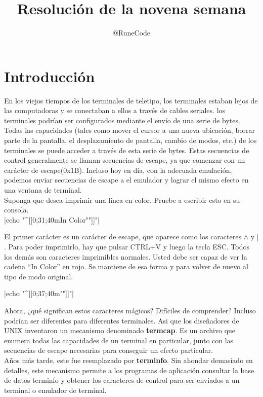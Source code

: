 \documentclass{article}
\title{Resolución de la novena semana}
\author{@RuneCode}
\begin{document}



\section{Introducción}%
En los viejos tiempos de los terminales de teletipo, los terminales estaban
lejos de las computadoras y se conectaban a ellos a través de cables seriales.
los terminales podrían ser configurados mediante el envío de una serie de
bytes. Todas las capacidades (tales como mover el cursor a una nueva ubicación,
borrar parte de la pantalla, el desplazamiento de pantalla, cambio de modos,
etc.) de los terminales se puede acceder a través de esta serie de bytes. Estas
secuencias de control generalmente se llaman secuencias de escape, ya que
comenzar con un carácter de escape(0x1B). Incluso hoy en día, con la adecuada
emulación, podemos enviar secuencias de escape a el emulador y lograr el mismo
efecto en una ventana de terminal.\\

Suponga que desea imprimir una línea en color. Pruebe a escribir esto en su
consola.\\

|echo "^[[0;31;40mIn Color""]]"|

El primer carácter es un carácter de escape, que aparece como los caracteres $\wedge$
y $[$. Para poder imprimirlo, hay que pulsar CTRL+V y luego la tecla ESC. Todos
los demás son caracteres imprimibles normales. Usted debe ser capaz de ver la
cadena “In Color” en rojo. Se mantiene de esa forma y para volver de nuevo al
tipo de modo original.

|echo "^[[0;37;40m""]]"|

Ahora, ¿qué significan estos caracteres mágicos? Difíciles de comprender?
Incluso podrían ser diferentes para diferentes terminales. Asi que los
diseñadores de UNIX inventaron un mecanismo denominado \textbf{termcap}. Es un
archivo que enumera todas las capacidades de un terminal en particular, junto
con las secuencias de escape necesarias para conseguir un efecto particular.\\
Años más tarde, este fue reemplazado por \textbf{terminfo}. Sin ahondar
demasiado en detalles, este mecanismo permite a los programas de aplicación
consultar la base de datos terminfo y obtener los caracteres de control para
ser enviados a un terminal o emulador de terminal.
\end{document}
